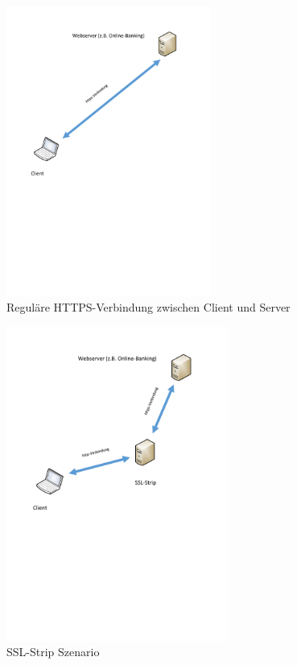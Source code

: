 \begin{figure}[h!]
	\centering
	\includegraphics[width=0.6\textwidth]{bilder/https.pdf}
	\caption{Reguläre HTTPS-Verbindung zwischen Client und Server}
	\label{fig:https}
\end{figure}

\begin{figure}[h!]
	\centering
	\includegraphics[width=0.65\textwidth]{bilder/sslstrip.pdf}
	\caption{SSL-Strip Szenario}
	\label{fig:sslstrip}
\end{figure}

